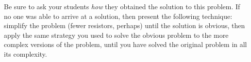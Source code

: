 





Be sure to ask your students {\it how} they obtained the solution to this problem.  If no one was able to arrive at a solution, then present the following technique: simplify the problem (fewer resistors, perhaps) until the solution is obvious, then apply the same strategy you used to solve the obvious problem to the more complex versions of the problem, until you have solved the original problem in all its complexity.




